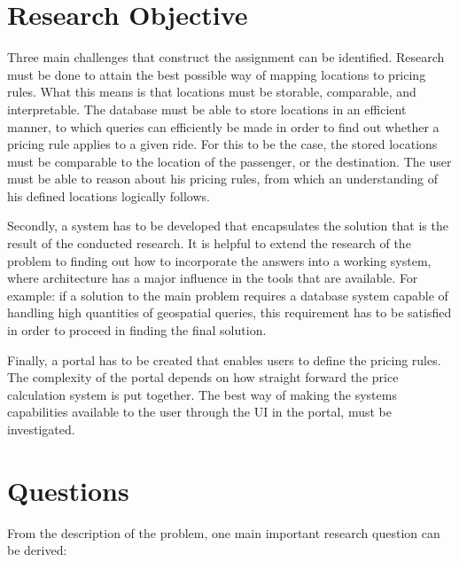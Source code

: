 \section{Research Objective}
Three main challenges that construct the assignment can be identified. Research must be done to attain the best possible way of mapping locations to pricing rules. What this means is that locations must be storable, comparable, and interpretable. The database must be able to store locations in an efficient manner, to which queries can efficiently be made in order to find out whether a pricing rule applies to a given ride. For this to be the case, the stored locations must be comparable to the location of the passenger, or the destination. The user must be able to reason about his pricing rules, from which an understanding of his defined locations logically follows.

Secondly, a system has to be developed that encapsulates the solution that is the result of the conducted research. It is helpful to extend the research of the problem to finding out how to incorporate the answers into a working system, where architecture has a major influence in the tools that are available. For example: if a solution to the main problem requires a database system capable of handling high quantities of geospatial queries, this requirement has to be satisfied in order to proceed in finding the final solution.

Finally, a portal has to be created that enables users to define the pricing rules. The complexity of the portal depends on how straight forward the price calculation system is put together. The best way of making the systems capabilities available to the user through the UI in the portal, must be investigated.

\section{Questions}

From the description of the problem, one main important research question can be derived: \\


